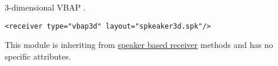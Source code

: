 3-dimensional VBAP \cite{Pulkki1997}.

\begin{lstlisting}[numbers=none]
<receiver type="vbap3d" layout="spkeaker3d.spk"/>
\end{lstlisting}

%

This module is inheriting from \hyperref[attrtab:speakerbased]{speaker
  based receiver} methods and has no specific attributes.
